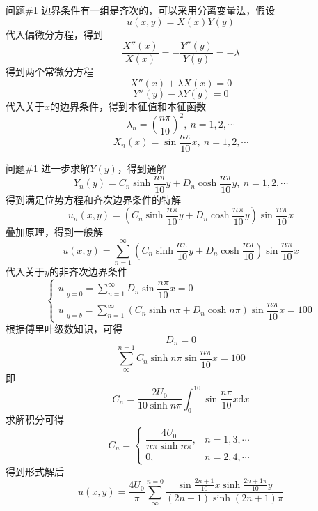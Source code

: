 \documentclass[12pt]{ctexart}
\begin{document}
    \begin{problem}{问题\#1}
        边界条件有一组是齐次的，可以采用分离变量法，假设
        $$
        u(x,y)=X(x)Y(y)
        $$
        代入偏微分方程，得到
        $$
        \dfrac{X''(x)}{X(x)}=-\dfrac{Y''(y)}{Y(y)}=-\lambda
        $$
        得到两个常微分方程
        $$
        X''(x)+\lambda X(x)=0
        $$
        $$
        Y''(y)-\lambda Y(y)=0
        $$
        代入关于$x$的边界条件，得到本征值和本征函数
        $$
        \lambda_n=(\dfrac{n\pi}{10})^2,\ n=1,2,\cdots
        $$
        $$
        X_n(x)=\sin\dfrac{n\pi}{10}x,\ n=1,2,\cdots
        $$  
    \end{problem}
    \begin{problem}{问题\#1}
        进一步求解$Y(y)$，得到通解
        $$
        Y_n(y)=C_n\sinh\dfrac{n\pi}{10}y+D_n\cosh\dfrac{n\pi}{10}y,\ n=1,2,\cdots
        $$
        得到满足位势方程和齐次边界条件的特解
        $$
        u_n(x,y)=\left(C_n\sinh\dfrac{n\pi}{10}y+D_n\cosh\dfrac{n\pi}{10}y\right)\sin\dfrac{n\pi}{10}x
        $$
        叠加原理，得到一般解
        $$
        u(x,y)=\sum_{n=1}^{\infty}\left(C_n\sinh\dfrac{n\pi}{10}y+D_n\cosh\dfrac{n\pi}{10}\right)\sin\dfrac{n\pi}{10}x
        $$
        代入关于$y$的非齐次边界条件
        $$
        \begin{cases}
            u|_{y=0}=\sum_{n=1}^{\infty}D_n\sin\dfrac{n\pi}{10}x=0\\
            u|_{y=b}=\sum_{n=1}^{\infty}\left(C_n\sinh n\pi+D_n\cosh n\pi\right)\sin\dfrac{n\pi}{10}x=100
        \end{cases}
        $$
        根据傅里叶级数知识，可得
        $$
        D_n=0
        $$
        $$
        \sum_{\infty}^{n=1}C_n\sinh n\pi\sin\dfrac{n\pi}{10}x=100
        $$
        即
        $$
        C_n=\dfrac{2U_0}{10\sinh n\pi}\int^{10}_{0}\sin\dfrac{n\pi}{10}x\text{d}x
        $$
        求解积分可得
        $$
        C_n=
        \begin{cases}
            \dfrac{4U_0}{n\pi\sinh n\pi},& n=1,3,\cdots\\
            0,& n=2,4,\cdots
        \end{cases}
        $$
        得到形式解后
        $$
        u(x,y)=\dfrac{4U_0}{\pi}\sum_{\infty}^{n=0}\dfrac{\sin\frac{2n+1}{10}x\sinh\frac{2n+1\pi}{10}y}{(2n+1)\sinh(2n+1)\pi}
        $$
    \end{problem}
    
\end{document}
